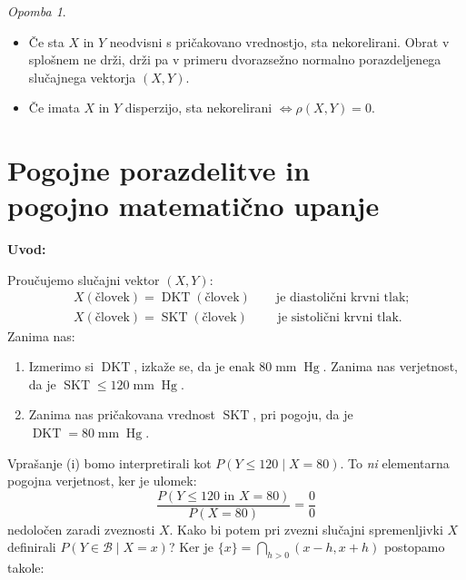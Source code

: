 \documentclass[12pt]{book}
\def\n{\noindent}
\theoremstyle{definition}
\theoremstyle{plain}
\theoremstyle{plain}
\theoremstyle{plain}
\theoremstyle{plain}
\theoremstyle{remark}
\newtheorem*{opomba}{Opomba}
\begin{document}
\begin{opomba}
    ~

    \begin{itemize}
        \item Če sta $X$ in $Y$ neodvisni s pričakovano vrednostjo, sta nekorelirani. Obrat v splošnem ne drži, drži pa v primeru dvorazsežno normalno porazdeljenega slučajnega vektorja $(X,Y)$.
        \item Če imata $X$ in $Y$ disperzijo, sta nekorelirani $\iff \rho(X,Y) = 0$.
    \end{itemize}
\end{opomba}

\chapter[Pogojne porazdelitve in pogojno matematično upanje]{Pogojne porazdelitve in \\ pogojno matematično upanje}

\n \textbf{Uvod:}

\n Proučujemo slučajni vektor $(X, Y)$: 
$$
\begin{aligned}
    &X(\text{človek}) = \operatorname{DKT}(\text{človek}) \qquad \text{je diastolični krvni tlak;} \\
    &X(\text{človek}) = \operatorname{SKT}(\text{človek}) \qquad \text{ je sistolični krvni tlak.}
\end{aligned}
$$
Zanima nas: 
\begin{enumerate}[label=(\roman*)]
    \item Izmerimo si $\operatorname{DKT}$, izkaže se, da je enak $80 \operatorname{mm} \operatorname{Hg}$. Zanima nas verjetnost, da je $\operatorname{SKT} \leq 120 \operatorname{mm} \operatorname{Hg}$.
    \item Zanima nas pričakovana vrednost $\operatorname{SKT}$, pri pogoju, da je $\operatorname{DKT} = 80 \operatorname{mm} \operatorname{Hg}$.
\end{enumerate}
 
\n Vprašanje (i) bomo interpretirali kot $P(Y \leq 120 \mid X=80)$. To \emph{ni} elementarna pogojna verjetnost, ker je ulomek: 
$$
\frac{P(Y \leq 120 \text { in } X=80)}{P(X=80)}=\frac{0}{0}
$$
nedoločen zaradi zveznosti $X$. Kako bi potem pri zvezni slučajni spremenljivki $X$ definirali $P(Y \in \mathcal{B} \mid X=x)$? Ker je $\{x\}=\bigcap_{h>0}(x-h, x+h)$ postopamo takole:
\end{document}
